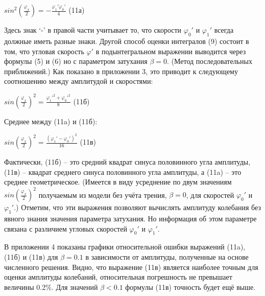 \documentclass[a4paper]{article}
\begin{document}
\begin{center}$sin^2(\frac{\varphi_x}{2})= -\frac{\varphi_1'\varphi_0'}{4}$ (11а)\end{center}
Здесь знак ‘-’ в правой части учитывает то, что скорости $\varphi_0'$ и $\varphi_1'$ всегда
должные иметь разные знаки.
Другой способ оценки интегралов (9) состоит в том, что угловая скорость $\varphi'$ в подынтегральном выражении выводится через формулы (5)
и (6) но с параметром затухания $\beta=0$. (Метод последовательных приближений.) Как показано в приложении 3, это приводит к следующему
соотношению между амплитудой и скоростями:
\begin{center}$sin(\frac{\varphi_x}{2})^2= \frac{\varphi_1'^2+\varphi_0'^2}{8}$ (11б)\end{center}
Среднее между (11a) и (11б):
\begin{center}$sin(\frac{\varphi_x}{2})^2= \frac{(\varphi_1' - \varphi_0')^2}{16}$ (11в)\end{center}
Фактически, (11б) – это средний квадрат синуса половинного угла 
амплитуды, (11в) – квадрат среднего синуса половинного угла амплитуды, а (11a) – это среднее геометрическое. (Имеется в виду усреднение
по двум значениям $sin(\frac{\varphi_x}{2})^2$ получаемым из модели без учёта трения,
$\beta=0$, для скоростей $\varphi_0'$ и $\varphi_1'$.) Отметим, что эти выражения позволяют
вычислять амплитуду колебания без явного знания значения параметра затухания. Но информация об этом параметре связана с различием
угловых скоростей $\varphi_0'$ и $\varphi_1'$.

В приложении 4 показаны графики относительной ошибки выражений
(11a), (11б) и (11в) для $\beta=0.1$ в зависимости от амплитуды, полученные на основе численного решения. Видно, что выражение (11в) является наиболее точным для оценки амплитуды колебаний, относительная погрешность не превышает величины 0.2\%. Для значений $\beta<0.1$ формулы
(11в) точность будет ещё выше. 
\end{document}

